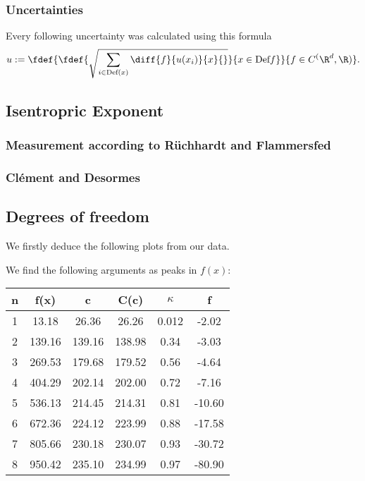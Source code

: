\documentclass[../main.tex]{subfiles}
\begin{document}
    \subsubsection*{Uncertainties}
        Every following uncertainty was calculated using this formula
        \[u:=\fdef{\fdef{\sqrt{\sum_{i\in\text{Def}(x)}\diff{f}{u(x_i)}{x}{}}}{x\in\text{Def}{f}}}{f\in C^(\R^d,\R)}.\]
		        
        
    \subsection{Isentropric Exponent}
        \subsubsection*{Measurement according to Rüchhardt and Flammersfed}

        \subsubsection*{Clément and Desormes}

    \subsection{Degrees of freedom}
        We firstly deduce the following plots from our data. 
        
        

        
        
        We find the following arguments as peaks in $f(x)$:
        \begin{table}[H]
            \centering
            \begin{tabular}{c|c|c|c|c|c}
                n & f(x)    & c       & C(c)    & $\kappa$ & f\\
                \hline
                1 & 13.18   & 26.36   & 26.26   & 0.012 & -2.02 \\
                2 & 139.16  & 139.16  & 138.98  & 0.34  & -3.03  \\
                3 & 269.53  & 179.68  & 179.52  & 0.56  & -4.64  \\
                4 & 404.29  & 202.14  & 202.00  & 0.72  & -7.16  \\
                5 & 536.13  & 214.45  & 214.31  & 0.81  & -10.60 \\
                6 & 672.36  & 224.12  & 223.99  & 0.88  & -17.58 \\
                7 & 805.66  & 230.18  & 230.07  & 0.93  & -30.72 \\
                8 & 950.42  & 235.10  & 234.99  & 0.97  & -80.90
            \end{tabular}
        \end{table}

        
\end{document}
